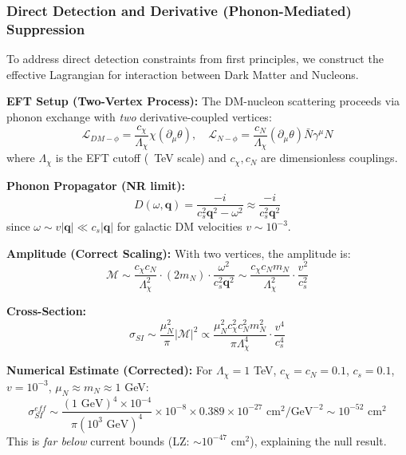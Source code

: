 \documentclass[a4paper,12pt]{article}
\begin{document}
\subsubsection{Direct Detection and Derivative (Phonon-Mediated) Suppression}
To address direct detection constraints from first principles, we construct the effective Lagrangian for interaction between Dark Matter and Nucleons.

\textbf{EFT Setup (Two-Vertex Process):}
The DM-nucleon scattering proceeds via phonon exchange with \emph{two} derivative-coupled vertices:
\begin{equation}
\mathcal{L}_{DM-\phi} = \frac{c_\chi}{\Lambda_\chi} \chi (\partial_\mu \theta), \quad 
\mathcal{L}_{N-\phi} = \frac{c_N}{\Lambda_\chi} (\partial_\mu \theta) \bar{N}\gamma^\mu N
\end{equation}
where $\Lambda_\chi$ is the EFT cutoff (~TeV scale) and $c_\chi, c_N$ are dimensionless couplings.

\textbf{Phonon Propagator (NR limit):}
\begin{equation}
D(\omega,\mathbf{q}) = \frac{-i}{c_s^2 \mathbf{q}^2 - \omega^2} \approx \frac{-i}{c_s^2 \mathbf{q}^2}
\end{equation}
since $\omega \sim v|\mathbf{q}| \ll c_s|\mathbf{q}|$ for galactic DM velocities $v \sim 10^{-3}$.

\textbf{Amplitude (Correct Scaling):}
With two vertices, the amplitude is:
\begin{equation}
\mathcal{M} \sim \frac{c_\chi c_N}{\Lambda_\chi^2} \cdot (2m_N) \cdot \frac{\omega^2}{c_s^2 \mathbf{q}^2}
\sim \frac{c_\chi c_N m_N}{\Lambda_\chi^2} \cdot \frac{v^2}{c_s^2}
\end{equation}

\textbf{Cross-Section:}
\begin{equation}
\sigma_{SI} \sim \frac{\mu_N^2}{\pi} |\mathcal{M}|^2 \propto \frac{\mu_N^2 c_\chi^2 c_N^2 m_N^2}{\pi \Lambda_\chi^4} \cdot \frac{v^4}{c_s^4}
\end{equation}

\textbf{Numerical Estimate (Corrected):}
For $\Lambda_\chi = 1$ TeV, $c_\chi = c_N = 0.1$, $c_s = 0.1$, $v = 10^{-3}$, $\mu_N \approx m_N \approx 1$ GeV:
\begin{equation}
\sigma_{SI}^{eff} \sim \frac{(1 \text{ GeV})^4 \times 10^{-4}}{\pi (10^3 \text{ GeV})^4} \times 10^{-8} \times 0.389 \times 10^{-27} \text{ cm}^2/\text{GeV}^{-2} \sim 10^{-52} \text{ cm}^2
\end{equation}
This is \emph{far below} current bounds (LZ: $\sim 10^{-47}$ cm$^2$), explaining the null result.
\end{document}
